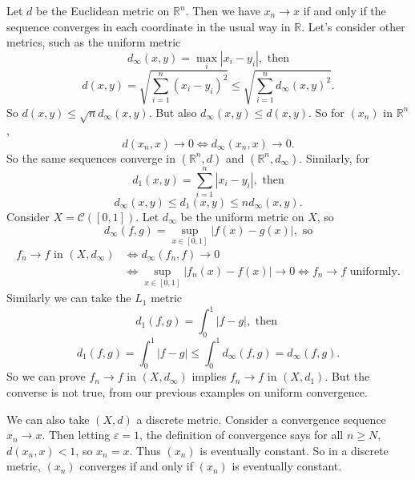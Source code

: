 \documentclass[12pt]{article}
\begin{document}
\begin{exbox}
	Let $d$ be the Euclidean metric on $\mathbb{R}^{n}$. Then we have $x_n \to x$ if and only if the sequence converges in each coordinate in the usual way in $\mathbb{R}$. Let's consider other metrics, such as the uniform metric
	\[
		d_{\infty}(x, y) = \max_{i}|x_i - y_i|, \text{ then}
	\]
	\[
		d(x, y) = \sqrt{\sum_{i = 1}^{n} (x_i - y_i)^2} \leq \sqrt{\sum_{i = 1}^{n} d_{\infty}(x, y)^2}
	.\]
	So $d(x, y) \leq \sqrt{n} d_{\infty}(x, y)$. But also $d_{\infty}(x, y) \leq d(x, y)$. So for $(x_n)$ in $\mathbb{R}^{n}$,
	\[
		d(x_n, x) \to 0 \iff d_{\infty}(x_n, x) \to 0
	.\]
	So the same sequences converge in $(\mathbb{R}^{n}, d)$ and $(\mathbb{R}^{n}, d_{\infty})$. Similarly, for 
	\[
		d_1(x, y) = \sum_{i = 1}^{n}|x_i - y_i|, \text{ then}
	\]
	\[
		d_{\infty}(x, y) \leq d_1(x, y) \leq n d_{\infty}(x, y)
	.\]
	Consider $X = \mathcal{C}([0, 1])$. Let $d_{\infty}$ be the uniform metric on $X$, so
	\[
		d_{\infty}(f, g) = \sup_{x\in[0,1]}|f(x) - g(x)|, \text{ so}
	\]
	\begin{align*}
		f_n \to f \text{ in } (X, d_{\infty}) &\iff d_{\infty}(f_n, f) \to 0 \\
						      &\iff \sup_{x \in [0, 1]}|f_n(x) - f(x)| \to 0 \iff f_n \to f \text{ uniformly}.
	\end{align*}
	Similarly we can take the $L_1$ metric
	\[
		d_1(f, g) = \int_{0}^{1}|f - g|, \text{ then }
	\]
	\[
		d_1(f, g) = \int_{0}^{1}|f - g| \leq \int_{0}^{1}d_{\infty}(f, g) = d_{\infty}(f, g)
	.\]
	So we can prove $f_n \to f$ in $(X, d_{\infty})$ implies $f_n \to f$ in $(X, d_1)$. But the converse is not true, from our previous examples on uniform convergence.

	We can also take $(X, d)$ a discrete metric. Consider a convergence sequence $x_n \to x$. Then letting $\varepsilon = 1$, the definition of convergence says for all $n \geq N$, $d(x_n, x) < 1$, so $x_n = x$. Thus $(x_n)$ is eventually constant. So in a discrete metric, $(x_n)$ converges if and only if $(x_n)$ is eventually constant.
\end{exbox}
\end{document}
